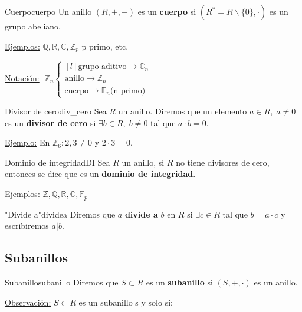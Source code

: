 \documentclass[10pt, a4paper]{article}
\newcommand{\R}{\mathbb{R}}
\newcommand{\Z}{\mathbb{Z}}
\newcommand{\C}{\mathbb{C}}
\newcommand{\Q}{\mathbb{Q}}
\newcommand{\F}{\mathbb{F}}
\newcommand{\obs}{\underline{Observación:} }
\newcommand{\ej}{\underline{Ejemplo:} }
\newcommand{\ejs}{\underline{Ejemplos:} }
\begin{document}
\begin{definition}{Cuerpo}{cuerpo}
Un anillo $(R, +, -)$ es un \textbf{cuerpo} si $(R^* = R \backslash \{0\}, \cdot)$ es un grupo abeliano.
\end{definition}

\underline{Ejemplos:} $\Q, \R, \C, \Z_p$ p primo, etc.

\vspace{3mm}

\underline{Notación:} $\; \Z_n  \left \{
\begin{matrix*}[l]
\textrm{grupo aditivo} \rightarrow \C_n \\
\textrm{anillo} \rightarrow \Z_n \\
\textrm{cuerpo} \rightarrow \mathbb{F}_n \textrm{(n primo)}
\end{matrix*} \right .$

\begin{definition}{Divisor de cero}{div_cero}
Sea $R$ un anillo. Diremos que un elemento $a \in R, \; a \neq 0$ es un \textbf{divisor de cero} si $\exists b \in R, \; b \neq 0$ tal que $a \cdot b = 0$.
\end{definition}

\ej En $\Z_6: \bar{2}, \bar{3} \neq \bar{0}$ y $\bar{2} \cdot \bar{3} = 0$.

\begin{definition}{Dominio de integridad}{DI}
Sea $R$ un anillo, si $R$ no tiene divisores de cero, entonces se dice que es un \textbf{dominio de integridad}.
\end{definition}

\ejs $\Z, \Q, \R, \C, \F_p$

\begin{definition}{"Divide a"}{dividea}
Diremos que $a$ \textbf{divide a} $b$ en $R$ si $\exists c \in R$ tal que $b = a \cdot c$ y escribiremos $a | b$.
\end{definition}

\subsection{Subanillos}

\vspace{3mm}

\begin{definition}{Subanillo}{subanillo}
Diremos que $S \subset R$ es un \textbf{subanillo} si $(S, +, \cdot)$ es un anillo.
\end{definition}

\obs $S \subset R$ es un subanillo s y solo si:
\end{document}
